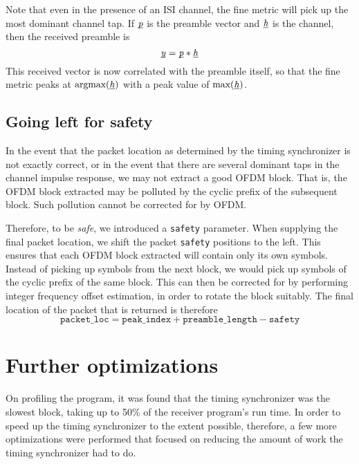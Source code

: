Note that even in the presence of an ISI channel, the fine metric will pick up
the most dominant channel tap. If $\underbar{\emph{p}}$ is the preamble vector and $\underbar{\emph{h}}$
is the channel, then the received preamble is
$$\underbar{\emph{y}} = \underbar{\emph{p}} * \underbar{\emph{h}}$$
This received vector is now correlated with the preamble itself, so that the
fine metric peaks at $\text{argmax}(\underbar{\emph{h}})$ with a peak value of
$\text{max}(\underbar{\emph{h}})$.


\subsection{Going left for safety}
\label{subsec:safety}

In the event that the packet location as determined by the timing synchronizer
is not exactly correct, or in the event that there are several dominant taps
in the channel impulse response, we may not extract a good OFDM block. That is,
the OFDM block extracted may be polluted by the cyclic prefix of the subsequent
block. Such pollution cannot be corrected for by OFDM.

Therefore, to be \emph{safe}, we introduced a \verb+safety+ parameter. When
supplying the final packet location, we shift the packet \verb+safety+
positions to the left. This ensures that each OFDM block extracted will contain
only its own symbols. Instead of picking up symbols from the next block, we
would pick up symbols of the cyclic prefix of the same block. This can then be
corrected for by performing integer frequency offset estimation, in order to
rotate the block suitably. The final location of the packet that is returned is
therefore $$\texttt{packet\_loc} = \texttt{peak\_index} +
\texttt{preamble\_length} - \texttt{safety}$$


\section{Further optimizations}

On profiling the program, it was found that the timing synchronizer was the
slowest block, taking up to 50\% of the receiver program's run time. In order
to speed up the timing synchronizer to the extent possible, therefore, a few
more optimizations were performed that focused on reducing the amount of work
the timing synchronizer had to do.

